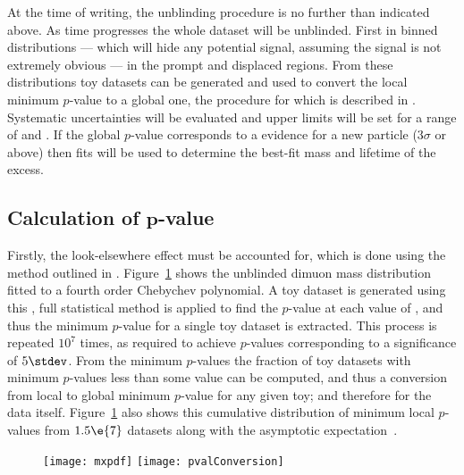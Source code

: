 At the time of writing, the unblinding procedure is no further than indicated above.
As time progresses the whole dataset will be unblinded.
First in binned distributions
--- which will hide any potential signal, assuming the signal is not extremely obvious ---
in the prompt and displaced regions.
From these distributions toy datasets can be generated and used to convert the local minimum
$p$-value to a global one, the procedure for which is described in .
Systematic uncertainties will be evaluated and upper limits will be set for a range of \mass{\db}
and \lifetime{\db}.
If the global $p$-value corresponds to a evidence for a new particle
($3\sigma$ or above) then fits will be used to
determine the best-fit mass and lifetime of the excess.


\subsection[Calculation of $p$-value]
{Calculation of $\boldsymbol{p}$-value}

Firstly, the look-elsewhere effect must be accounted for, which
is done using the method outlined in .
Figure~\ref{fig:db:mmumu} shows the unblinded dimuon mass distribution fitted to a fourth order
Chebychev polynomial.
A toy dataset is generated using this \PDF, full statistical method is applied to find the
$p$-value at each value of , and thus the minimum $p$-value for a single toy dataset is
extracted.
This process is repeated $10^7$ times, as required to achieve $p$-values corresponding to a
significance of $5\stdev$.
From the minimum $p$-values the fraction of toy datasets with minimum $p$-values less than some
value can be computed, and thus a conversion from local to global minimum $p$-value for any given
toy; and therefore for the data itself.
Figure~\ref{fig:db:mmumu} also shows this cumulative distribution of minimum local $p$-values from
$1.5\e{7}$ datasets along with the asymptotic expectation~\cite{Gross:2010qma}.

\begin{figure}
  \begin{center}
    \texttt{[image: mxpdf]}
    \texttt{[image: pvalConversion]}
    \caption[]
    {
    }
    \label{fig:db:mmumu}
  \end{center}
\end{figure}




